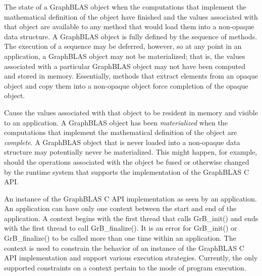 
 The state of a GraphBLAS object when the computations that 
implement the mathematical definition of the object have finished and the values 
associated with that object are available to any method that would load them 
into a non-opaque data structure.   
A GraphBLAS object is fully defined by the sequence of methods.   
The execution of a sequence may be deferred, however, so at any point 
in an application, a GraphBLAS object may not be materialized; that is, 
the values associated with a particular GraphBLAS object may not have 
been computed and stored in memory.   Essentially, methods that extract elements 
from an opaque object and copy them into a non-opaque object force completion of the
opaque object. 

 Cause the values associated with that object to be resident 
in memory and visible to an application.  A GraphBLAS object has been 
\emph{materialized} when the computations that implement the mathematical definition 
of the object are {\it complete}. 
A GraphBLAS object that is never loaded into a non-opaque data structure may 
potentially never be materialized.  This might happen, for  example, should the operations 
associated with the object be fused or otherwise changed by the runtime system 
that supports the implementation of the GraphBLAS C API.   

  An instance of the GraphBLAS C API implementation
as seen by an application.  An application can have only one context between the 
start and end of the application.  
A context begins with the first thread that calls {\sf GrB\_init()} and ends with the 
first thread to call {\sf GrB\_finalize()}.  
It is an error for {\sf GrB\_init()} or {\sf GrB\_finalize()} to be called more than one
time within an application.  The context is used to constrain the behavior of an
instance of the GraphBLAS C API implementation and support various execution strategies.
Currently, the only
supported constraints on a context pertain to the mode of program execution.

